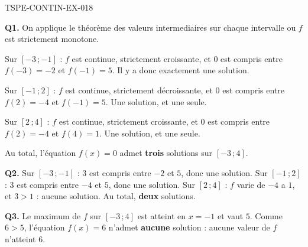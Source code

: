 \begin{corrige}{TSPE-CONTIN-EX-018}

\textbf{Q1.} On applique le théorème des valeurs intermediaires sur chaque intervalle ou $f$ est strictement monotone.

Sur $[-3\,;-1]$ : $f$ est continue, strictement croissante, et $0$ est compris entre $f(-3) = -2$ et $f(-1) = 5$. Il y a donc exactement une solution.

Sur $[-1\,;2]$ : $f$ est continue, strictement décroissante, et $0$ est compris entre $f(2) = -4$ et $f(-1) = 5$. Une solution, et une seule.

Sur $[2\,;4]$ : $f$ est continue, strictement croissante, et $0$ est compris entre $f(2) = -4$ et $f(4) = 1$. Une solution, et une seule.

Au total, l'équation $f(x) = 0$ admet \textbf{trois} solutions sur $[-3\,;4]$.

\textbf{Q2.} Sur $[-3\,;-1]$ : $3$ est compris entre $-2$ et $5$, donc une solution. Sur $[-1\,;2]$ : $3$ est compris entre $-4$ et $5$, donc une solution. Sur $[2\,;4]$ : $f$ varie de $-4$ a $1$, et $3 > 1$ : aucune solution. Au total, \textbf{deux} solutions.

\textbf{Q3.} Le maximum de $f$ sur $[-3\,;4]$ est atteint en $x = -1$ et vaut $5$. Comme $6 > 5$, l'équation $f(x) = 6$ n'admet \textbf{aucune} solution : aucune valeur de $f$ n'atteint $6$.
\end{corrige}
